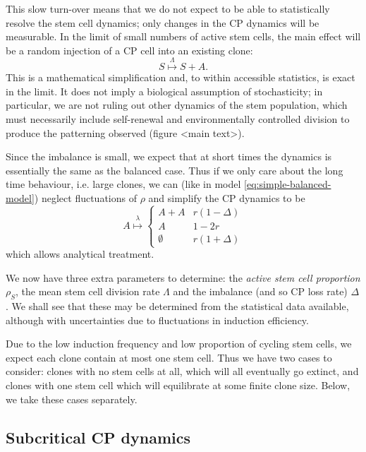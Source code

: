 \documentclass[10pt,UKenglish]{article}
\begin{document}
This slow turn-over means that we do not expect to be able to statistically resolve the stem cell dynamics; only changes in the CP dynamics will be measurable. In the limit of small numbers of active stem cells, the main effect will be a random injection of a CP cell into an existing clone: 
\begin{equation}
S \overset{\Lambda}{\longmapsto} S+A. \label{eq:stem-division-model}
\end{equation}
This is a mathematical simplification and, to within accessible statistics, is exact in the limit. It does not imply a biological assumption of stochasticity; in particular, we are not ruling out other dynamics of the stem population, which must necessarily include self-renewal and environmentally controlled division to produce the patterning observed (figure <main text>).

Since the imbalance is small, we expect that at short times the dynamics is essentially the same as the balanced case. Thus if we only care about the long time behaviour, i.e. large clones, we can (like in model \ref{eq:simple-balanced-model}) neglect fluctuations of $\rho$ and simplify the CP dynamics to be
\begin{equation}
A \overset{\lambda}{\longmapsto} \begin{cases}
A+A & r(1 - \Delta) \\
A & 1 - 2r \\
\emptyset & r(1 + \Delta)
\end{cases}\label{eq:subcritical-cp-model}
\end{equation} which allows analytical treatment.

We now have three extra parameters to determine: the \emph{active stem cell proportion} $\rho_S$, the mean stem cell division rate $\Lambda$ and the imbalance (and so CP loss rate) $\Delta$. We shall see that these may be determined from the statistical data available, although with uncertainties due to fluctuations in induction efficiency.

Due to the low induction frequency and low proportion of cycling stem cells, we expect each clone contain at most one stem cell. Thus we have two cases to consider: clones with no stem cells at all, which will all eventually go extinct, and clones with one stem cell which will equilibrate at some finite clone size. Below, we take these cases separately.

\subsection{Subcritical CP dynamics}
\end{document}
